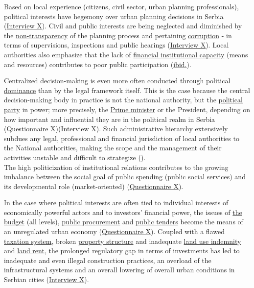 \documentclass[11pt]{report}
\begin{document}
\begin{itemize}
Based on local experience (citizens, civil sector, urban planning professionals), political interests have hegemony over urban planning decisions in Serbia (\href{InterviewX}{Interview X}).
Civil and public interests are being neglected and diminished by the \underline{non-transparency} of the planning process and pertaining \underline{corruption} - in terms of supervisions, inspections and public hearings (\href{InterviewX}{Interview X}).
\href{ref}{\citealt{ministarstvo_prostora_urbani_2014}}
Local authorities also emphasize that the lack of \underline{financial institutional capacity} (means and resources) contributes to poor public participation (\href{ref}{ibid.}).

\underline{Centralized decision-making} is even more often conducted through \underline{political dominance} than by the legal framework itself.
This is the case because the central decision-making body in practice is not the national authority, but the \underline{political party} in power;
more precisely, the  \underline{Prime minister} or the President, depending on how important and influential they are in the political realm in Serbia (\href{Questionnaire Experts Post-socialist}{Questionnaire X})(\href{InterviewX}{Interview X}).
Such \underline{administrative hierarchy} extensively subdues any legal, professional and financial jurisdiction of local authorities to the National authorities, making the scope and the management of their activities unstable and difficult to strategize (\href{Vujosevic}{\citealt{vujosevic_novi_2012}}).
\\
The high politicization of institutional relations contributes to the growing imbalance between the social goal of public spending (public social services) and its developmental role (market-oriented) (\href{Questionnaire Experts Post-socialist}{Questionnaire X}).

In the case where political interests are often tied to individual interests of economically powerful actors and to investors' financial power, the issues of \underline{the budget} (all levels), \underline{public procurement} and \underline{public tenders} become the means of an unregulated urban economy (\href{Questionnaire Experts Post-socialist}{Questionnaire X}).%
Coupled with a flawed \underline{taxation system}, broken \underline{property structure} and inadequate \underline{land use indemnity} and \underline{land rent}, the prolonged regulatory gap in terms of investments has led to inadequate and even illegal construction practices, an overload of the infrastructural systems and an overall lowering of overall urban conditions in Serbian cities (\href{InterviewX}{Interview X}).


\end{itemize}
\end{document}
